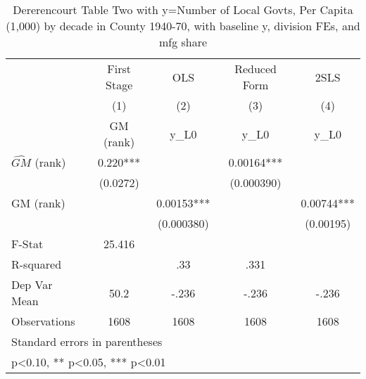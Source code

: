 \begin{table}[htbp]\centering
\def\sym#1{\ifmmode^{#1}\else\(^{#1}\)\fi}
\caption{Dererencourt Table Two with y=Number of Local Govts, Per Capita (1,000) by decade in County 1940-70, with baseline y, division FEs, and mfg share}
\begin{tabular}{l*{4}{c}}
\toprule
                    & First Stage   &         OLS   &Reduced Form   &        2SLS   \\
                    &\multicolumn{1}{c}{(1)}&\multicolumn{1}{c}{(2)}&\multicolumn{1}{c}{(3)}&\multicolumn{1}{c}{(4)}\\
                    &\multicolumn{1}{c}{GM  (rank)}&\multicolumn{1}{c}{y\_L0}&\multicolumn{1}{c}{y\_L0}&\multicolumn{1}{c}{y\_L0}\\
\midrule
$\hat{GM}$ (rank)   &       0.220***&               &     0.00164***&               \\
                    &    (0.0272)   &               &  (0.000390)   &               \\
\addlinespace
GM  (rank)          &               &     0.00153***&               &     0.00744***\\
                    &               &  (0.000380)   &               &   (0.00195)   \\
\midrule
F-Stat              &      25.416   &               &               &               \\
R-squared           &               &         .33   &        .331   &               \\
Dep Var Mean        &        50.2   &       -.236   &       -.236   &       -.236   \\
Observations        &        1608   &        1608   &        1608   &        1608   \\
\bottomrule
\multicolumn{5}{l}{\footnotesize Standard errors in parentheses}\\
\multicolumn{5}{l}{\footnotesize * p<0.10, ** p<0.05, *** p<0.01}\\
\end{tabular}
\end{table}
